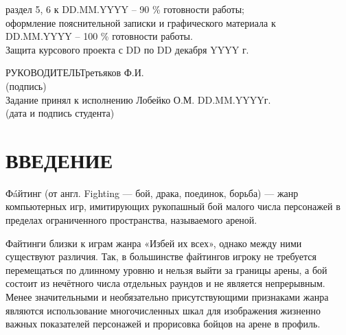 \documentclass[14pt,a4paper]{extreport}
\begin{document}
\begin{enumerate}
	\underline{\hspace*{16cm}}\hspace*{-16cm}раздел 5, 6 к DD.MM.YYYY  –  90 \% готовности работы;\\
	\underline{\hspace*{16cm}}\hspace*{-16cm}оформление пояснительной записки и графического материала к\\
	\underline{\hspace*{16cm}}\hspace*{-16cm}DD.MM.YYYY – 100 \% готовности работы.\\
	\underline{\hspace*{16cm}}\hspace*{-16cm}Защита курсового проекта с DD по DD декабря YYYY г.\\
	\end{enumerate}
	\hspace*{7cm}РУКОВОДИТЕЛЬ\underline{\hspace*{6cm}}\hspace*{-3.9cm}Третьяков Ф.И.\\
	\hspace*{11.5cm}\small (подпись) \normalsize\\
	\bigskip
	Задание принял к исполнению \underline{\hspace*{10.5cm}}\hspace*{-8cm} Лобейко О.М. DD.MM.YYYYг.\\
	\hspace*{7cm}\small (дата и подпись студента) \normalsize\\
	\newpage
	\pagestyle{plain}
	
	\renewcommand\contentsname{\center\normalsize \textbf{СОДЕРЖАНИЕ} \endcenter}
	\tableofcontents
	\endcenter
	\newpage
	\section*{\center\normalsize ВВЕДЕНИЕ \endcenter}
	\hspace{4ex}Фáйтинг (от англ. Fighting — бой, драка, поединок, борьба) — жанр компьютерных игр, имитирующих рукопашный бой малого числа персонажей в пределах ограниченного пространства, называемого ареной.

\hspace{4ex}Файтинги близки к играм жанра «Избей их всех», однако между ними существуют различия. Так, в большинстве файтингов игроку не требуется перемещаться по длинному уровню и нельзя выйти за границы арены, а бой состоит из нечётного числа отдельных раундов и не является непрерывным. Менее значительными и необязательно присутствующими признаками жанра являются использование многочисленных шкал для изображения жизненно важных показателей персонажей и прорисовка бойцов на арене в профиль.\\
\end{document}
